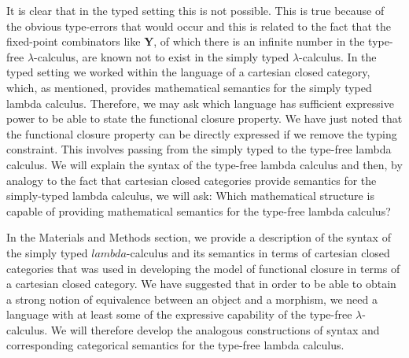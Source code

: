 It is clear that in the typed setting this is not possible. This is true because of the obvious type-errors that would occur and this is related to the fact that the fixed-point combinators like $\mathbf{Y}$, of which there is an infinite number in the type-free $\lambda$-calculus, are known not to exist in the simply typed $\lambda$-calculus. In the typed setting we worked within the language of a cartesian closed category, which, as mentioned, provides mathematical semantics for the simply typed lambda calculus. Therefore, we may ask which language has sufficient expressive power to be able to state the functional closure property. We have just noted that the functional closure property can be directly expressed if we remove the typing constraint. This involves passing from the simply typed to the type-free lambda calculus. We will explain the syntax of the type-free lambda calculus and then, by analogy to the fact that cartesian closed categories provide semantics for the simply-typed lambda calculus, we will ask: Which mathematical structure is capable of providing mathematical semantics for the type-free lambda calculus?

In the Materials and Methods section, we provide a description of the syntax of the simply typed $lambda$-calculus and its semantics in terms of cartesian closed categories that was used in developing the model of functional closure in terms of a cartesian closed category. We have suggested that in order to be able to obtain a strong notion of equivalence between an object and a morphism, we need a language with at least some of the expressive capability of the type-free $\lambda$-calculus. We will therefore develop the analogous constructions of syntax and corresponding categorical semantics for the type-free lambda calculus.

